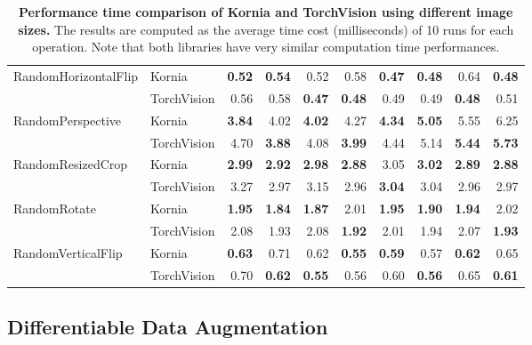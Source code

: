 \begin{table}[!ht]
\begin{tabular}{llrrrrrrrr}
\midrule
RandomHorizontalFlip & Kornia &   \bfseries0.52 &   \bfseries0.54 &   0.52 &   0.58 &   \bfseries0.47 &   \bfseries0.48 &   0.64 &   \bfseries0.48 \\
                   & TorchVision &   0.56 &   0.58 &   \bfseries0.47 &   \bfseries0.48 &   0.49 &   0.49 &   \bfseries0.48 &   0.51 \\
\midrule
RandomPerspective & Kornia &   \bfseries3.84 &   4.02 &   \bfseries4.02 &   4.27 &   \bfseries4.34 &   \bfseries5.05 &   5.55 &   6.25 \\
                   & TorchVision &   4.70 &   \bfseries3.88 &   4.08 &   \bfseries3.99 &   4.44 &   5.14 &   \bfseries5.44 &   \bfseries5.73 \\
\midrule
RandomResizedCrop & Kornia &   \bfseries2.99 &   \bfseries2.92 &   \bfseries2.98 &   \bfseries2.88 &   3.05 &   \bfseries3.02 &   \bfseries2.89 &   \bfseries2.88 \\
                   & TorchVision &   3.27 &   2.97 &   3.15 &   2.96 &   \bfseries3.04 &   3.04 &   2.96 &   2.97 \\
\midrule
RandomRotate & Kornia &   \bfseries1.95 &   \bfseries1.84 &   \bfseries1.87 &   2.01 &   \bfseries1.95 &   \bfseries1.90 &   \bfseries1.94 &   2.02 \\
                   & TorchVision &   2.08 &   1.93 &   2.08 &   \bfseries1.92 &   2.01 &   1.94 &   2.07 &   \bfseries1.93 \\
\midrule
RandomVerticalFlip & Kornia &   \bfseries0.63 &   0.71 &   0.62 &  \bfseries 0.55 &   \bfseries0.59 &   0.57 &   \bfseries0.62 &   0.65 \\
                   & TorchVision &   0.70 &   \bfseries0.62 &   \bfseries0.55 &   0.56 &   0.60 &   \bfseries0.56 &   0.65 &   \bfseries0.61 \\
\bottomrule
\end{tabular}
\vspace{.5cm}
\caption{\label{tab: op_kornia_vs_torchvision} {\bf Performance time comparison of Kornia and TorchVision using different image sizes.} The results are computed as the average time cost (milliseconds) of 10 runs for each operation. Note that  both libraries have very similar computation time performances. 
}
\end{table}

\subsection{Differentiable Data Augmentation}
\label{section:use_cases:differentiable computer vision}

